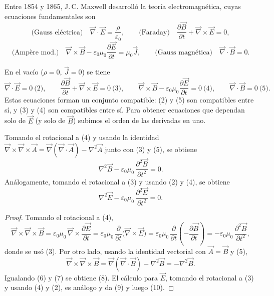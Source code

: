 Entre 1854 y 1865, J.\,C. Maxwell desarrolló la teoría electromagnética,
cuyas ecuaciones fundamentales son
\[
\text{(Gauss eléctrica)}\quad \vec\nabla\cdot\vec E = \frac{\rho}
{\varepsilon_0}, \qquad \text{(Faraday)}\quad \frac{\partial\vec
B}{\partial t}+\vec\nabla\times\vec E=0,
\]
\[
\text{(Ampère mod.)}\quad \vec\nabla\times\vec B - \varepsilon_0\mu_0
\frac{\partial\vec E}{\partial t} = \mu_0\vec J, \qquad
\text{(Gauss magnética)}\quad \vec\nabla\cdot\vec B=0.
\]

En el vacío ($\rho=0$, $\vec J=0$) se tiene
\[
\vec\nabla\cdot\vec E=0 \ \text{(2)}, \qquad \frac{\partial\vec
B}{\partial t}+\vec\nabla\times\vec E=0 \ \text{(3)}, \qquad
\vec\nabla\times\vec B-\varepsilon_0\mu_0\frac{\partial\vec E}{\partial
t}=0 \ \text{(4)}, \qquad \vec\nabla\cdot\vec B=0 \ \text{(5)}.
\]
Estas ecuaciones forman un conjunto compatible: (2) y (5) son
compatibles entre sí, y (3) y (4) son compatibles entre sí. Para obtener
ecuaciones que dependan solo de $\vec E$ (y solo de $\vec B$) subimos el
orden de las derivadas en uno.

\begin{proposicionc}
Tomando el rotacional a (4) y usando la identidad
$\vec\nabla\times\vec\nabla\times\vec A = \vec\nabla(\vec\nabla\cdot
\vec A) - \nabla^2\vec A$ junto con (3) y (5), se obtiene
\[
\nabla^2\vec B - \varepsilon_0\mu_0\, \frac{\partial^2\vec B}{\partial
t^2} = 0 . \tag{8}
\]
Análogamente, tomando el rotacional a (3) y usando (2) y (4), se
obtiene
\[
\nabla^2\vec E - \varepsilon_0\mu_0\, \frac{\partial^2\vec E}{\partial
t^2} = 0 . \tag{10}
\]
\end{proposicionc}

\begin{proof}
Tomando el rotacional a (4),
\[
\vec\nabla\times\vec\nabla\times\vec B = \varepsilon_0\mu_0\,
\vec\nabla\times\frac{\partial\vec E}{\partial t} = \varepsilon_0\mu_0\,
\frac{\partial}{\partial t}\big(\vec\nabla\times\vec E\big) =
\varepsilon_0\mu_0\, \frac{\partial}{\partial t}\left(-\frac{\partial
\vec B}{\partial t}\right) = -\varepsilon_0\mu_0\, \frac{\partial^2\vec
B}{\partial t^2}, \tag{6}
\]
donde se usó (3). Por otro lado, usando la identidad vectorial con
$\vec A=\vec B$ y (5),
\[
\vec\nabla\times\vec\nabla\times\vec B = \vec\nabla(\vec\nabla\cdot\vec
B) - \nabla^2\vec B = -\nabla^2\vec B . \tag{7}
\]
Igualando (6) y (7) se obtiene (8). El cálculo para $\vec E$, tomando el
rotacional a (3) y usando (4) y (2), es análogo y da (9) y luego (10).
\qedhere
\end{proof}

